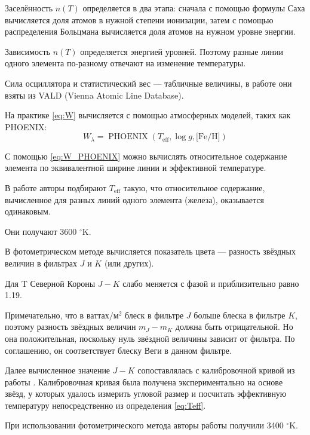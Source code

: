 Заселённость $n(T)$ определяется в два этапа: сначала с помощью формулы Саха вычисляется доля атомов в нужной степени ионизации, затем с помощью распределения Больцмана вычисляется доля атомов на нужном уровне энергии. 

Зависимость $n(T)$ определяется энергией уровней. Поэтому разные линии одного элемента по-разному отвечают на изменение температуры.

Сила осциллятора и статистический вес --- табличные величины, в работе \cite{TCRBtemperature} они взяты из VALD (Vienna Atomic Line Database).

На практике \eqref{eq:W} вычисляется с помощью атмосферных моделей, таких как PHOENIX:
\begin{equation}
W_\lambda = \operatorname{PHOENIX}(T_\text{eff}, \log g, \text{[Fe/H]})
\label{eq:W_PHOENIX}
\end{equation}

С помощью \eqref{eq:W_PHOENIX} можно вычислять относительное содержание элемента по эквивалентной ширине линии и эффективной температуре.

В работе \cite{TCRBtemperature} авторы подбирают $T_\text{eff}$ такую, что относительное содержание, вычисленное для разных линий одного элемента (железа), оказывается одинаковым.

Они получают 3600 ${}^\circ$K.



В фотометрическом методе вычисляется показатель цвета --- разность звёздных величин в фильтрах $J$ и $K$ (или других).

Для T Северной Короны $J - K$ слабо меняется с фазой и приблизительно равно 1.19.

Примечательно, что в $\text{ваттах}/\text{м}^2$ блеск в фильтре $J$ больше блеска в фильтре $K$, поэтому разность звёздных величин $m_J - m_K$ должна быть отрицательной. Но она положительная, поскольку нуль звёздной величины зависит от фильтра. По соглашению, он соответствует блеску Веги в данном фильтре.

Далее вычисленное значение $J - K$ сопоставлялась с калибровочной кривой из работы \cite{AlonsoCalibration}. Калибровочная кривая была получена экспериментально на основе звёзд, у которых удалось измерить угловой размер и посчитать эффективную температуру непосредственно из определения \eqref{eq:Teff}.

При использовании фотометрического метода авторы работы \cite{TCRBtemperature} получили 3400 ${}^\circ$K.

